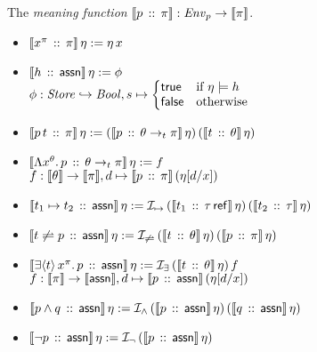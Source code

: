 \documentclass[12pt,a4paper]{report}
\newcommand{\I}{\mathcal{I}}
\begin{document}
\noindent The {\em meaning function} $\llbracket p\,\mathrel{::}\,\pi\rrbracket: \mathit{Env}_p \to \llbracket\pi\rrbracket$.
\begin{itemize}
  \item $\llbracket x^\pi\,\mathrel{::}\,\pi\rrbracket\,\eta := \eta\,x$

  \item $\llbracket h\,\mathrel{::}\,\mathsf{assn}\rrbracket\,\eta := \phi$ \\[1ex]
        $\phi:\mathit{Store} \hookrightarrow \mathit{Bool},
          s \mapsto \left\{\!\!\!\begin{array}{ll}
                      \mathsf{true}   & \text{if } \eta \models h \\
                      \mathsf{false}  & \text{otherwise}
                    \end{array}\right.$

  \item $\llbracket p\,t\,\mathrel{::}\,\pi\rrbracket\,\eta :=
          (\llbracket p\,\mathrel{::}\,\theta\rightarrow_t\pi\rrbracket\,\eta)\,
          (\llbracket t\,\mathrel{::}\,\theta\rrbracket\,\eta)$

  \item $\llbracket\Lambda x^\theta.\,p\,\mathrel{::}\,\theta\rightarrow_t\pi\rrbracket\,\eta := f$ \\[1ex]
        $f: \llbracket\theta\rrbracket \to \llbracket\pi\rrbracket,
          d \mapsto \llbracket p\,\mathrel{::}\,\pi\rrbracket\,(\eta[d/x])$

  \item $\semantic{\tj{t_1 \mapsto t_2}{\tassn}}\,\eta :=
          \I_{\mapsto}\,(\semantic{\tj{t_1}{\tref{\tau}}}\,\eta)\,(\semantic{\tj{t_2}{\tau}}\,\eta)$

  \item $\semantic{\tj{t \not\rightleftharpoons p}{\tassn}}\,\eta :=
          \I_{\not\rightleftharpoons}\,(\semantic{\tj{t}{\theta}}\,\eta)\,(\semantic{\tj{p}{\pi}}\,\eta)$

  \item $\semantic{\tj{\qbex{x^\pi}{t}{p}}{\tassn}}\,\eta :=
          \I_\exists\,(\semantic{\tj{t}{\theta}}\,\eta)\,f$ \\[1ex]
        $f: \llbracket\pi\rrbracket \to \llbracket\mathsf{assn}\rrbracket, d \mapsto \llbracket p\,\mathrel{::}\,\mathsf{assn}\rrbracket\,(\eta[d/x])$

  \item $\semantic{\tj{p \wedge q}{\tassn}}\,\eta :=
          \I_\wedge\,(\semantic{\tj{p}{\tassn}}\,\eta)\,(\semantic{\tj{q}{\tassn}}\,\eta)$

  \item $\semantic{\tj{\neg p}{\tassn}}\,\eta :=
          \I_\neg\,(\semantic{\tj{p}{\tassn}}\,\eta)$
\end{itemize}
\end{document}
